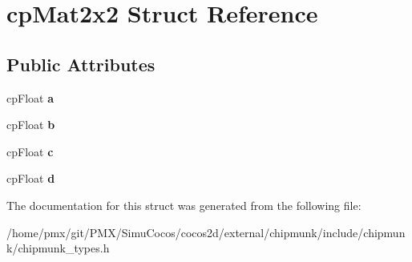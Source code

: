\hypertarget{structcpMat2x2}{}\section{cp\+Mat2x2 Struct Reference}
\label{structcpMat2x2}
\subsection*{Public Attributes}
\begin{DoxyCompactItemize}
\item 
\mbox{\label{structcpMat2x2_a3f392cee2281ef681ea192e22dae75fa}} 
cp\+Float {\bfseries a}
\item 
\mbox{\label{structcpMat2x2_a633387544257634501d1b8d3d3b7cb01}} 
cp\+Float {\bfseries b}
\item 
\mbox{\label{structcpMat2x2_aa64133ad4fce658b0ccd4626ca021b45}} 
cp\+Float {\bfseries c}
\item 
\mbox{\label{structcpMat2x2_a326abf4082ad424f8911f54c42a0e85c}} 
cp\+Float {\bfseries d}
\end{DoxyCompactItemize}


The documentation for this struct was generated from the following file\+:\begin{DoxyCompactItemize}
\item 
/home/pmx/git/\+P\+M\+X/\+Simu\+Cocos/cocos2d/external/chipmunk/include/chipmunk/chipmunk\+\_\+types.\+h\end{DoxyCompactItemize}
